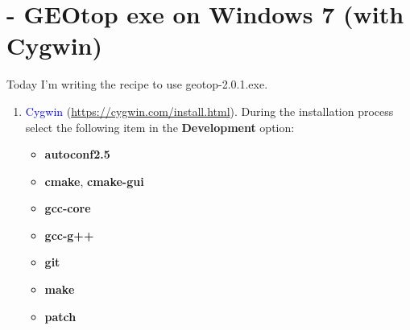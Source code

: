 \section{ - GEOtop exe on Windows 7 (with Cygwin)}\label{sec:20150817}

Today I'm writing the recipe to use geotop-2.0.1.exe.

\begin{enumerate}
\item \textcolor{blue}{Cygwin} (\url{https://cygwin.com/install.html}). During the installation process select the following item in the \textbf{Development} option:
  \begin{itemize}
  \item \textbf{autoconf2.5}
  \item \textbf{cmake}, \textbf{cmake-gui}
  \item \textbf{gcc-core}
  \item \textbf{gcc-g++}
  \item \textbf{git}
  \item \textbf{make}
  \item \textbf{patch}
  \end{itemize}
\end{enumerate}